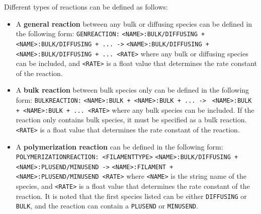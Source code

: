 \documentclass[11pt, oneside]{article}   	%
\begin{document}
\noindent Different types of reactions can be defined as follows:
\begin{itemize}


\item A \textbf{general reaction} between any bulk or diffusing species can be defined in the following form: \newline\texttt{GENREACTION:}\newline 
\texttt{<NAME>:BULK/DIFFUSING + <NAME>:BULK/DIFFUSING + ... ->}\newline
\texttt{<NAME>:BULK/DIFFUSING + <NAME>:BULK/DIFFUSING + ... <RATE>}\newline\newline 
where any bulk or diffusing species can be included, and \texttt{<RATE>} is a float value that determines the rate constant of the reaction.

\item A \textbf{bulk reaction} between bulk species only can be defined in the following form: \newline\newline
\texttt{BULKREACTION:}\newline
\texttt{<NAME>:BULK + <NAME>:BULK + ... ->}\newline
\texttt{ <NAME>:BULK + <NAME>:BULK + ... <RATE>}\newline\newline 
where any bulk species can be included. If the reaction only contains bulk species, it must be specified as a bulk reaction. \texttt{<RATE>} is a float value that determines the rate constant  of the reaction.

\item A \textbf{polymerization reaction} can be defined in the following form:\newline\newline
\texttt{POLYMERIZATIONREACTION: <FILAMENTTYPE>}\newline
\texttt{<NAME>:BULK/DIFFUSING + <NAME>:PLUSEND/MINUSEND ->}\newline
\texttt{<NAME>:FILAMENT + <NAME>:PLUSEND/MINUSEND <RATE>}\newline\newline 
where \texttt{<NAME>} is the string name of the species, and \texttt{<RATE>} is a float value that determines the rate constant  of the reaction. It is noted that the first species listed can be either \texttt{DIFFUSING} or \texttt{BULK}, and the reaction can contain a \texttt{PLUSEND} or \texttt{MINUSEND}.


\end{itemize}
\end{document}
